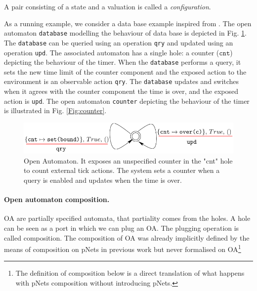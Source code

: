 \documentclass[runningheads]{llncs}
\begin{document}
A pair consisting of a state and a valuation is called a \emph{configuration}.
%

\begin{example} As a running example, we consider a data base example inspired from \cite{Gorrieri:2001}. The open automaton \texttt{database}  modelling the behaviour of data base is depicted in Fig. \ref{Fig:SpecOA}. The \texttt{database} can be queried using an operation \texttt{qry} and updated using an operation \texttt{upd}. The associated automaton has a single hole:  a counter ($\texttt{cnt}$)  depicting  the behaviour of the timer. When the \texttt{database}  performs a query,  it sets the new time limit of the counter component and the exposed action to the environment is an observable  action \texttt{qry}.
The \texttt{database} updates and  switches when it agrees with the counter component the time is over, and the exposed action is \texttt{upd}.
The open automaton \texttt{counter}    depicting  the behaviour of the timer is illustrated in Fig. \ref{Fig:counter}. 
\end{example}
\begin{figure}[h]
 \centering
   \includegraphics[width=.9\textwidth]{Figures/database.pdf}
   \caption{Open Automaton. It exposes an unspecified counter in the "cnt" hole
 to count external tick actions. The system sets a counter when a query is enabled and updates  when  the time is over.\label{Fig:SpecOA}} 
\end{figure}





\paragraph{Open automaton composition.}

OA are partially specified automata, that partiality comes  from the holes.
A hole can be seen as a port in which we can plug an OA.
The plugging operation is called composition.
The composition of OA was already implicitly defined by the means of composition on pNets in previous work \cite{henrio:01299562} but never  formalised on OA\footnote{The definition of composition below is a direct translation of what happens with pNets composition \cite{henrio:01299562} without  introducing pNets.}
\end{document}
